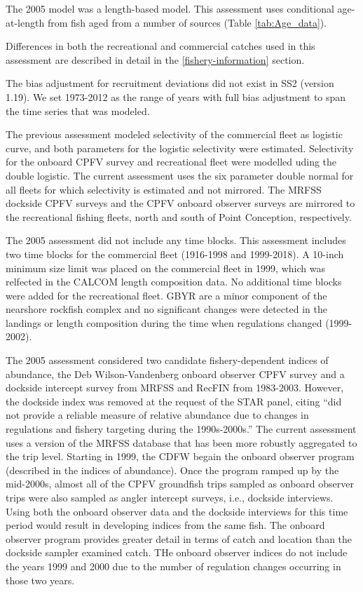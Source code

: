 \documentclass[12pt,]{article}
\begin{document}
The 2005 model was a length-based model. This assessment uses
conditional age-at-length from fish aged from a number of sources (Table
\ref{tab:Age_data}).

Differences in both the recreational and commercial catches used in this
assessment are described in detail in the \ref{fishery-information}
section.

The bias adjustment for recruitment deviations did not exist in SS2
(version 1.19). We set 1973-2012 as the range of years with full bias
adjustment to span the time series that was modeled.

The previous assessment modeled selectivity of the commercial fleet as
logistic curve, and both parameters for the logistic selectivity were
estimated. Selectivity for the onboard CPFV survey and recreational
fleet were modelled uding the double logistic. The current assessment
uses the six parameter double normal for all fleets for which
selectivity is estimated and not mirrored. The MRFSS dockside CPFV
surveys and the CPFV onboard observer surveys are mirrored to the
recreational fishing fleets, north and south of Point Conception,
respectively.

The 2005 assessment did not include any time blocks. This assessment
includes two time blocks for the commercial fleet (1916-1998 and
1999-2018). A 10-inch minimum size limit was placed on the commercial
fleet in 1999, which was relfected in the CALCOM length composition
data. No additional time blocks were added for the recreational fleet.
GBYR are a minor component of the nearshore rockfish complex and no
significant changes were detected in the landings or length composition
during the time when regulations changed (1999-2002).

The 2005 assessment considered two candidate fishery-dependent indices
of abundance, the Deb Wilson-Vandenberg onboard observer CPFV survey and
a dockside intercept survey from MRFSS and RecFIN from 1983-2003.
However, the dockside index was removed at the request of the STAR
panel, citing ``did not provide a reliable measure of relative abundance
due to changes in regulations and fishery targeting during the
1990s-2000s.'' The current assessment uses a version of the MRFSS
database that has been more robustly aggregated to the trip level.
Starting in 1999, the CDFW begain the onboard observer program
(described in the indices of abundance). Once the program ramped up by
the mid-2000s, almost all of the CPFV groundfish trips sampled as
onboard observer trips were also sampled as angler intercept surveys,
i.e., dockside interviews. Using both the onboard observer data and the
dockside interviews for this time period would result in developing
indices from the same fish. The onboard observer program provides
greater detail in terms of catch and location than the dockside sampler
examined catch. THe onboard observer indices do not include the years
1999 and 2000 due to the number of regulation changes occurring in those
two years.
\end{document}
